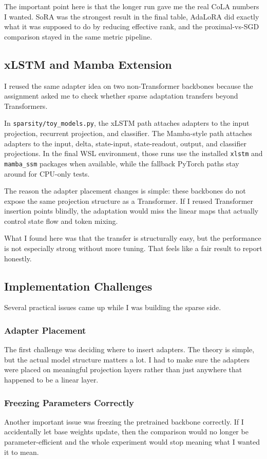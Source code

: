 \documentclass[11pt]{article}
\begin{document}
The important point here is that the longer run gave me the real CoLA numbers I wanted. SoRA was the strongest result in the final table, AdaLoRA did exactly what it was supposed to do by reducing effective rank, and the proximal-vs-SGD comparison stayed in the same metric pipeline.

\subsection{xLSTM and Mamba Extension}
I reused the same adapter idea on two non-Transformer backbones because the assignment asked me to check whether sparse adaptation transfers beyond Transformers.

In \texttt{sparsity/toy\_models.py}, the xLSTM path attaches adapters to the input projection, recurrent projection, and classifier. The Mamba-style path attaches adapters to the input, delta, state-input, state-readout, output, and classifier projections. In the final WSL environment, those runs use the installed \texttt{xlstm} and \texttt{mamba\_ssm} packages when available, while the fallback PyTorch paths stay around for CPU-only tests.

The reason the adapter placement changes is simple: these backbones do not expose the same projection structure as a Transformer. If I reused Transformer insertion points blindly, the adaptation would miss the linear maps that actually control state flow and token mixing.

What I found here was that the transfer is structurally easy, but the performance is not especially strong without more tuning. That feels like a fair result to report honestly.

\subsection{Implementation Challenges}
Several practical issues came up while I was building the sparse side.

\subsubsection{Adapter Placement}
The first challenge was deciding where to insert adapters. The theory is simple, but the actual model structure matters a lot. I had to make sure the adapters were placed on meaningful projection layers rather than just anywhere that happened to be a linear layer.

\subsubsection{Freezing Parameters Correctly}
Another important issue was freezing the pretrained backbone correctly. If I accidentally let base weights update, then the comparison would no longer be parameter-efficient and the whole experiment would stop meaning what I wanted it to mean.
\end{document}
